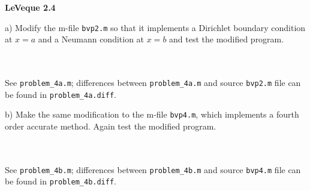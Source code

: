 \textbf{LeVeque 2.4} 

a) Modify the m-file \texttt{bvp2.m} so that it implements a Dirichlet boundary condition at $x = a$ and a Neumann
   condition at $x = b$ and test the modified program.

\begin{solution}\ \\\\
   See \texttt{problem\_4a.m}; differences between \texttt{problem\_4a.m} and source \texttt{bvp2.m} file can be found
   in \texttt{problem\_4a.diff}.
\end{solution}

\pagebreak
b) Make the same modification to the m-file \texttt{bvp4.m}, which implements a fourth order accurate method. Again test
   the modified program.

\begin{solution}\ \\\\
   See \texttt{problem\_4b.m}; differences between \texttt{problem\_4b.m} and source \texttt{bvp4.m} file can be found
   in \texttt{problem\_4b.diff}.
\end{solution}